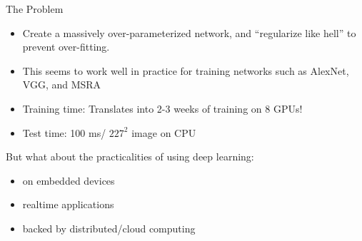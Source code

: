 \documentclass[t,xcolor=dvipsnames]{beamer}
\begin{document}
\begin{frame}{The Problem}
\begin{itemize}
    \item Create a massively over-parameterized network, and ``regularize like hell'' to prevent over-fitting.
    \item This seems to work well in practice for training networks such as AlexNet, VGG, and MSRA
    \item Training time: Translates into 2-3 weeks of training on 8 GPUs!
    \item Test time: 100 ms/ $227^2$ image on CPU
\end{itemize}
\vfill
But what about the practicalities of using deep learning:
\begin{itemize}
    \item on embedded devices
    \item realtime applications
    \item backed by distributed/cloud computing
\end{itemize}
\end{frame}
\end{document}
